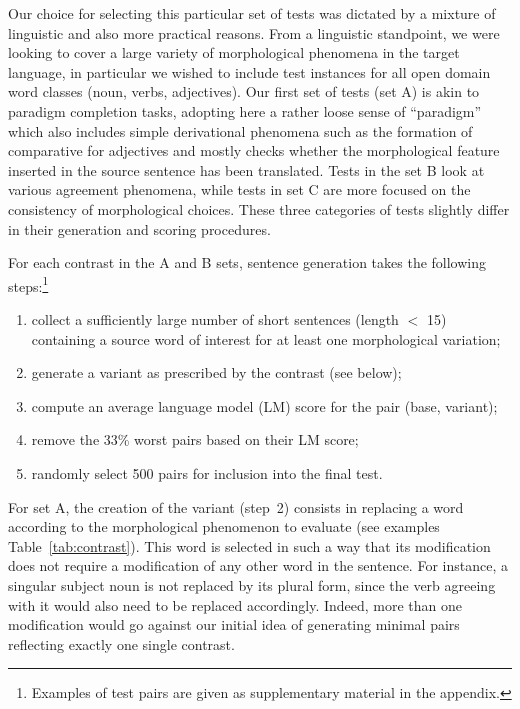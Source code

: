 \documentclass[11pt,letterpaper,final,nohyperref]{article}
\begin{document}
Our choice for selecting this particular set of tests was dictated by a mixture of linguistic and also more practical reasons. From a linguistic standpoint, we were looking to cover a large variety of morphological phenomena in the target language, in particular we wished to include test instances for all open domain word classes (noun, verbs, adjectives). Our first set of tests (set A) is akin to paradigm completion tasks, adopting here a rather loose sense of ``paradigm'' which also includes simple derivational phenomena such as the formation of comparative for adjectives and mostly checks whether the morphological feature inserted in the source sentence has been translated. Tests in the set B look at various agreement phenomena, while tests in set C are more focused on the consistency of morphological choices. These three categories of tests slightly differ in their generation and scoring procedures.

For each contrast in the A and B sets, sentence generation takes the following steps:\footnote{Examples of test pairs are given as supplementary material in the appendix.}
\begin{enumerate}
\item collect a sufficiently large number of short sentences (length $<$ 15) containing a source word
  of interest for at least one morphological variation; 
\item generate a variant as prescribed by the contrast (see below);
\item compute an average language model (LM) score for the pair (base, variant);
\item remove the 33\% worst pairs based on their LM score;
\item randomly select 500 pairs for inclusion into the final test.
\end{enumerate}

For set A, the creation of the variant (step~2) consists in replacing a word according to the morphological phenomenon to evaluate (see examples Table~\ref{tab:contrast}). This word is selected in such a way that its modification does not require a modification of any other word in the sentence. For instance, a singular subject noun is not replaced by its plural form, since the verb agreeing with it would also need to be replaced accordingly. Indeed, more than one modification would go against our initial idea of generating minimal pairs reflecting exactly one single contrast.
\end{document}
